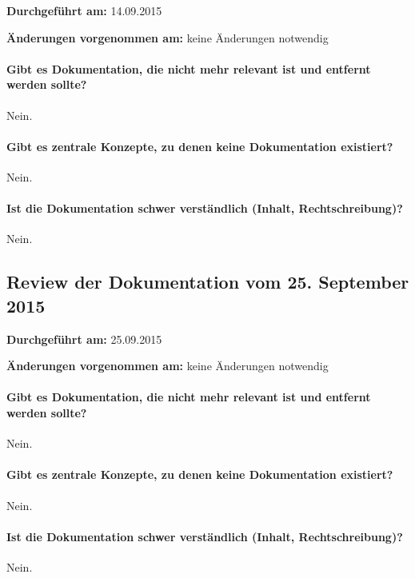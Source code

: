 \textbf{Durchgeführt am:} 14.09.2015

\textbf{Änderungen vorgenommen am:} keine Änderungen notwendig

\paragraph{Gibt es Dokumentation, die nicht mehr relevant ist und entfernt werden sollte?}
Nein.

\paragraph{Gibt es zentrale Konzepte, zu denen keine Dokumentation existiert?}
Nein.

\paragraph{Ist die Dokumentation schwer verständlich (Inhalt, Rechtschreibung)?}
Nein.


\subsection{Review der Dokumentation vom 25. September 2015}

\textbf{Durchgeführt am:} 25.09.2015

\textbf{Änderungen vorgenommen am:} keine Änderungen notwendig

\paragraph{Gibt es Dokumentation, die nicht mehr relevant ist und entfernt werden sollte?}
Nein.

\paragraph{Gibt es zentrale Konzepte, zu denen keine Dokumentation existiert?}
Nein.

\paragraph{Ist die Dokumentation schwer verständlich (Inhalt, Rechtschreibung)?}
Nein.
